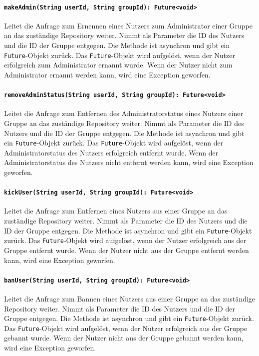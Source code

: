 \documentclass[parskip=full]{scrartcl}
\begin{document}
\paragraph{\texttt{makeAdmin(String userId, String groupId): Future<void>}}
Leitet die Anfrage zum Ernennen eines Nutzers zum Administrator einer Gruppe an das zuständige Repository weiter. Nimmt als Parameter die ID des Nutzers und die ID der Gruppe entgegen. Die Methode ist asynchron und gibt ein \texttt{Future}-Objekt zurück. Das \texttt{Future}-Objekt wird aufgelöst, wenn der Nutzer erfolgreich zum Administrator ernannt wurde. Wenn der Nutzer nicht zum Administrator ernannt werden kann, wird eine Exception geworfen.
\paragraph{\texttt{removeAdminStatus(String userId, String groupId): Future<void>}}
Leitet die Anfrage zum Entfernen des Administratorstatus eines Nutzers einer Gruppe an das zuständige Repository weiter. Nimmt als Parameter die ID des Nutzers und die ID der Gruppe entgegen. Die Methode ist asynchron und gibt ein \texttt{Future}-Objekt zurück. Das \texttt{Future}-Objekt wird aufgelöst, wenn der Administratorstatus des Nutzers erfolgreich entfernt wurde. Wenn der Administratorstatus des Nutzers nicht entfernt werden kann, wird eine Exception geworfen.
\paragraph{\texttt{kickUser(String userId, String groupId): Future<void>}}
Leitet die Anfrage zum Entfernen eines Nutzers aus einer Gruppe an das zuständige Repository weiter. Nimmt als Parameter die ID des Nutzers und die ID der Gruppe entgegen. Die Methode ist asynchron und gibt ein \texttt{Future}-Objekt zurück. Das \texttt{Future}-Objekt wird aufgelöst, wenn der Nutzer erfolgreich aus der Gruppe entfernt wurde. Wenn der Nutzer nicht aus der Gruppe entfernt werden kann, wird eine Exception geworfen.
\paragraph{\texttt{banUser(String userId, String groupId): Future<void>}}
Leitet die Anfrage zum Bannen eines Nutzers aus einer Gruppe an das zuständige Repository weiter. Nimmt als Parameter die ID des Nutzers und die ID der Gruppe entgegen. Die Methode ist asynchron und gibt ein \texttt{Future}-Objekt zurück. Das \texttt{Future}-Objekt wird aufgelöst, wenn der Nutzer erfolgreich aus der Gruppe gebannt wurde. Wenn der Nutzer nicht aus der Gruppe gebannt werden kann, wird eine Exception geworfen.
\end{document}
